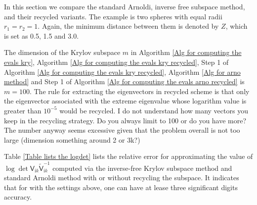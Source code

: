 In this section we compare the standard Arnoldi, inverse free subspace method, and their recycled variants. The example is 
two spheres with equal radii $r_{1} = r_{2} = 1$. Again, the minimum distance between them is denoted by $Z$, which is set as 0.5, 1.5 and 3.0. 

The dimension of the Krylov subspace $m$ in Algorithm \ref{Alg for computing the evals kry}, Algorithm \ref{Alg for computing the evals kry recycled}, Step 1 of Algorithm \ref{Alg for computing the evals kry recycled},
Algorithm \ref{Alg for arno method} and Step 1 of Algorithm \ref{Alg for computing the evals arno recycled} 
is $m = 100$. The rule for extracting the eigenvectors in recycled scheme is that only the eigenvector associated with the extreme eigenvalue whose 
logarithm value is greater than $10^{-5}$ would be recycled. {\color{red} I do not understand how many vectors you keep in the recycling strategy. Do you always limit to 100 or do you have more?
The number anyway seems excessive given that the problem overall is not too large (dimension something around 2 or 3k?)}

Table \ref{Table lists the logdet} lists the relative error for approximating the value of $\log\det\mathsf{V}_{\mathrm{i}k}\tilde{\mathsf{V}}_{\mathrm{i}k}^{-1}$ 
computed via the inverse-free Krylov subspace method and standard Arnoldi method with or without recycling the subspace. It indicates that for with the settings above, one 
can have at lease three significant digits accuracy.
 
